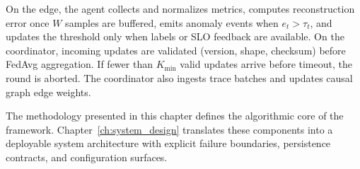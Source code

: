 On the edge, the agent collects and normalizes metrics, computes reconstruction
error once $W$ samples are buffered, emits anomaly events when $e_t>\tau_t$, and
updates the threshold only when labels or SLO feedback are available. On the
coordinator, incoming updates are validated (version, shape, checksum) before
FedAvg aggregation. If fewer than $K_{\min}$ valid updates arrive before
timeout, the round is aborted. The coordinator also ingests trace batches and
updates causal graph edge weights.

The methodology presented in this chapter defines the algorithmic core of the
framework. Chapter~\ref{ch:system_design} translates these components into a
deployable system architecture with explicit failure boundaries, persistence
contracts, and configuration surfaces.

